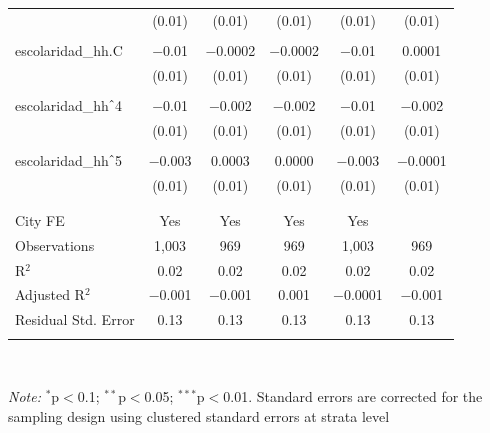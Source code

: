 \begin{table}[H]
\begin{tabularx}{0.9\textwidth}{@{\extracolsep{-7pt}}lccccc}
 & (0.01) & (0.01) & (0.01) & (0.01) & (0.01) \\    & & & & & \\   escolaridad\_hh.C & $-$0.01 & $-$0.0002 & $-$0.0002 & $-$0.01 & 0.0001 \\    & (0.01) & (0.01) & (0.01) & (0.01) & (0.01) \\    & & & & & \\   escolaridad\_hh$\hat{\mkern6mu}$4 & $-$0.01 & $-$0.002 & $-$0.002 & $-$0.01 & $-$0.002 \\    & (0.01) & (0.01) & (0.01) & (0.01) & (0.01) \\    & & & & & \\   escolaridad\_hh$\hat{\mkern6mu}$5 & $-$0.003 & 0.0003 & 0.0000 & $-$0.003 & $-$0.0001 \\    & (0.01) & (0.01) & (0.01) & (0.01) & (0.01) \\    & & & & & \\  \hline \\[-1.8ex]  City FE & Yes & Yes & Yes & Yes &  \\  Observations & 1,003 & 969 & 969 & 1,003 & 969 \\  R$^{2}$ & 0.02 & 0.02 & 0.02 & 0.02 & 0.02 \\  Adjusted R$^{2}$ & $-$0.001 & $-$0.001 & 0.001 & $-$0.0001 & $-$0.001 \\  Residual Std. Error & 0.13 & 0.13 & 0.13 & 0.13 & 0.13 \\  \hline  \hline \\[-1.8ex]  \end{tabularx} \\ \parbox[]{\textwidth}{\textit{Note:} $^{*}$p$<$0.1; $^{**}$p$<$0.05; $^{***}$p$<$0.01. Standard errors are corrected for the sampling design using clustered standard errors at strata level }  \end{table} 
